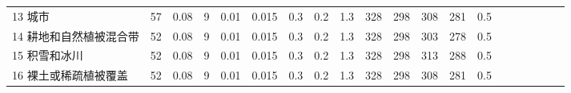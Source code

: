 \begin{sidewaystable}[]
\begin{tabular}{@{}lccccccccccccccccccc@{}}
        13 城市         & 57  & 0.08 & 9 & 0.01 & 0.015 & 0.3 & 0.2 & 1.3 & 328 & 298 & 308 & 281 & 0.5 \\
        14 耕地和自然植被混合带 & 52  & 0.08 & 9 & 0.01 & 0.015 & 0.3 & 0.2 & 1.3 & 328 & 298 & 303 & 278 & 0.5 \\
        15 积雪和冰川      & 52  & 0.08 & 9 & 0.01 & 0.015 & 0.3 & 0.2 & 1.3 & 328 & 298 & 313 & 288 & 0.5 \\
        16 裸土或稀疏植被覆盖  & 52  & 0.08 & 9 & 0.01 & 0.015 & 0.3 & 0.2 & 1.3 & 328 & 298 & 308 & 281 & 0.5 \\\bottomrule
        \end{tabular}
    \end{sidewaystable}
    
